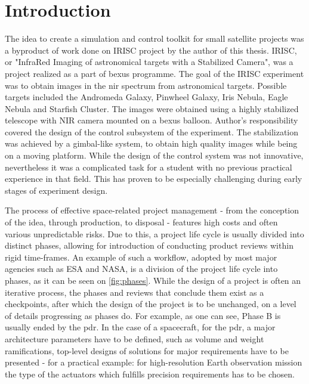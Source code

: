 \section{Introduction}\label{sec:introduction}
    The idea to create a simulation and control toolkit for small satellite projects was a byproduct of work done on IRISC project by the author of this thesis. IRISC, or "InfraRed Imaging of astronomical targets with a Stabilized Camera", was a project realized as a part of \ac{bexus} programme. The goal of the IRISC experiment was to obtain images in the \ac{nir} spectrum from astronomical targets. Possible targets included the Andromeda Galaxy, Pinwheel Galaxy, Iris Nebula, Eagle Nebula and Starfish Cluster. The images were obtained using a highly stabilized telescope with NIR camera mounted on a \ac{bexus} balloon. Author's responsibility covered the design of the control subsystem of the experiment. The stabilization was achieved by a gimbal-like system, to obtain high quality images while being on a moving platform\cite{irisc-sed}. While the design of the control system was not innovative, nevertheless it was a complicated task for a student with no previous practical experience in that field. This has proven to be especially challenging during early stages of experiment design.

    The process of effective space-related project management - from the conception of the idea, through production, to disposal - features high costs and often various unpredictable risks. Due to this, a project life cycle is usually divided into distinct phases, allowing for introduction of conducting product reviews within rigid time-frames. An example of such a workflow, adopted by most major agencies such as ESA\cite{managementecss} and NASA\cite{kapurch2010nasa}, is a division of the project life cycle into phases, as it can be seen on \autoref{fig:phases}. While the design of a project is often an iterative process, the phases and reviews that conclude them exist as a checkpoints, after which the design of the project is to be unchanged, on a level of details progressing as phases do. For example, as one can see, Phase B is usually ended by the \ac{pdr}. In the case of a spacecraft, for the \ac{pdr}, a major architecture parameters have to be defined, such as volume and weight ramifications, top-level designs of solutions for major requirements have to be presented - for a practical example: for high-resolution Earth observation mission the type of the actuators which fulfills precision requirements has to be chosen.


